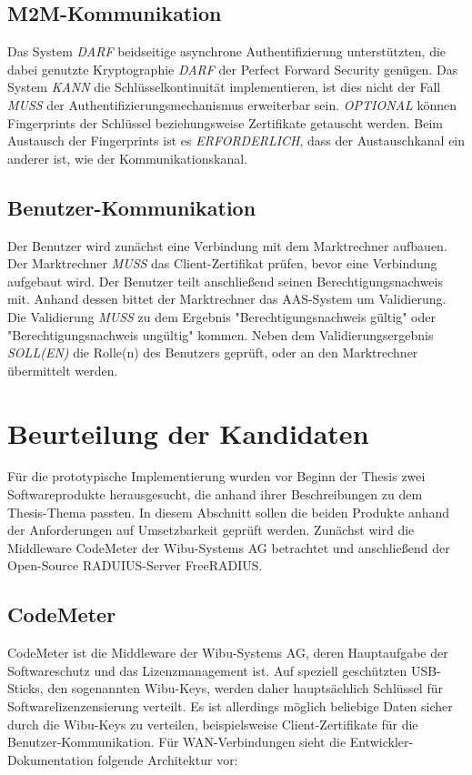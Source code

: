 \documentclass[11pt,a4paper]{report}
\begin{document}
\subsection{M2M-Kommunikation}

Das System \textit{DARF} beidseitige asynchrone Authentifizierung unterstützten, die dabei genutzte Kryptographie \textit{DARF} der Perfect Forward Security genügen. Das System \textit{KANN} die Schlüsselkontinuität implementieren, ist dies nicht der Fall \textit{MUSS} der Authentifizierungsmechanismus erweiterbar sein. \textit{OPTIONAL} können Fingerprints der Schlüssel beziehungsweise Zertifikate getauscht werden. Beim Austausch der Fingerprints ist es \textit{ERFORDERLICH}, dass der Austauschkanal ein anderer ist, wie der Kommunikationskanal.

\subsection{Benutzer-Kommunikation}

Der Benutzer wird zunächst eine Verbindung mit dem Marktrechner aufbauen. Der Marktrechner \textit{MUSS} das Client-Zertifikat prüfen, bevor eine Verbindung aufgebaut wird. Der Benutzer teilt anschließend seinen Berechtigungsnachweis mit. Anhand dessen bittet der Marktrechner das AAS-System um Validierung. Die Validierung \textit{MUSS} zu dem Ergebnis "Berechtigungsnachweis gültig" oder "Berechtigungsnachweis ungültig" kommen. Neben dem Validierungsergebnis \textit{SOLL(EN)} die Rolle(n) des Benutzers geprüft, oder an den Marktrechner übermittelt werden.

\section{Beurteilung der Kandidaten}

Für die prototypische Implementierung wurden vor Beginn der Thesis zwei Softwareprodukte herausgesucht, die anhand ihrer Beschreibungen zu dem Thesis-Thema passten. In diesem Abschnitt sollen die beiden Produkte anhand der Anforderungen auf Umsetzbarkeit geprüft werden. Zunächst wird die Middleware CodeMeter der Wibu-Systems AG betrachtet und anschließend der Open-Source RADUIUS-Server FreeRADIUS.

\subsection{CodeMeter}

CodeMeter ist die Middleware der Wibu-Systems AG, deren Hauptaufgabe der Softwareschutz und das Lizenzmanagement ist. Auf speziell geschützten USB-Sticks, den sogenannten Wibu-Keys, werden daher hauptsächlich Schlüssel für Softwarelizenzensierung verteilt. Es ist allerdings möglich beliebige Daten sicher durch die Wibu-Keys zu verteilen, beispielsweise Client-Zertifikate für die Benutzer-Kommunikation. Für WAN-Verbindungen sieht die Entwickler-Dokumentation folgende Architektur vor:
\end{document}
